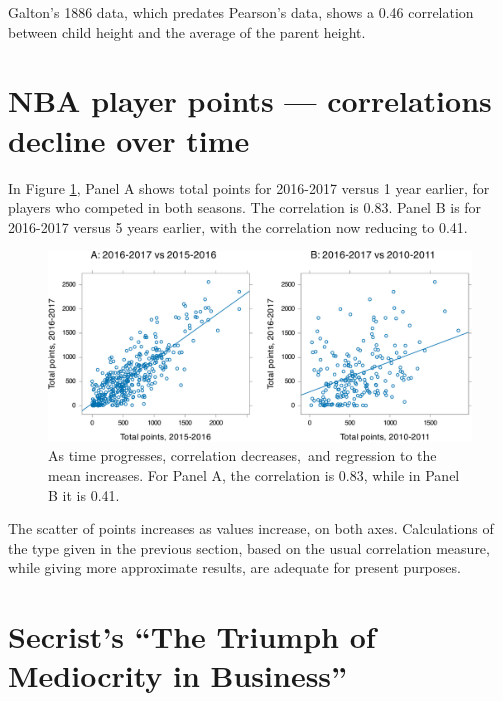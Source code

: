 \documentclass[
  10pt,
  b5paper]{book}
\begin{document}
Galton's 1886 data, which predates Pearson's data, shows a 0.46 correlation between child height and the average of the parent height.

\hypertarget{nba-player-points-correlations-decline-over-time}{%
\section{NBA player points --- correlations decline over time}\label{nba-player-points-correlations-decline-over-time}}

In Figure \ref{fig:NBA}, Panel A shows total points for 2016-2017 versus 1 year earlier, for players who competed in both seasons. The correlation is 0.83. Panel B is for 2016-2017 versus 5 years earlier, with the correlation now reducing to 0.41.

\begin{figure}[H]

{\centering \includegraphics[width=1\linewidth]{07-regress_files/figure-latex/NBA-1} 

}

\caption{As time progresses, correlation decreases, and regression to the mean increases.  For Panel A, the correlation is 0.83, while in Panel B it is 0.41.}\label{fig:NBA}
\end{figure}

The scatter of points increases as values increase, on both axes. Calculations of the type given in the previous section, based on the usual correlation measure, while giving more approximate results, are adequate for present purposes.

\hypertarget{secrists-the-triumph-of-mediocrity-in-business}{%
\section{Secrist's ``The Triumph of Mediocrity in Business''}\label{secrists-the-triumph-of-mediocrity-in-business}}
\end{document}
